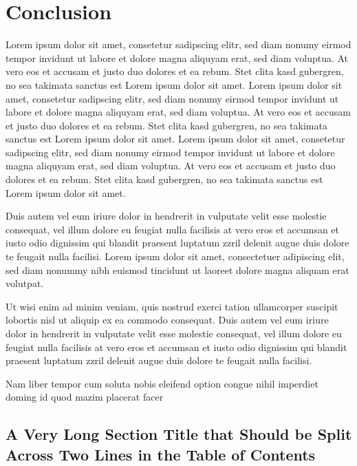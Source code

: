 
\chapter{Conclusion}

Lorem ipsum dolor sit amet, consetetur sadipscing elitr, sed diam nonumy eirmod tempor invidunt ut labore et dolore magna aliquyam erat, sed diam voluptua. At vero eos et accusam et justo duo dolores et ea rebum. Stet clita kasd gubergren, no sea takimata sanctus est Lorem ipsum dolor sit amet. Lorem ipsum dolor sit amet, consetetur sadipscing elitr, sed diam nonumy eirmod tempor invidunt ut labore et dolore magna aliquyam erat, sed diam voluptua. At vero eos et accusam et justo duo dolores et ea rebum. Stet clita kasd gubergren, no sea takimata sanctus est Lorem ipsum dolor sit amet. Lorem ipsum dolor sit amet, consetetur sadipscing elitr, sed diam nonumy eirmod tempor invidunt ut labore et dolore magna aliquyam erat, sed diam voluptua. At vero eos et accusam et justo duo dolores et ea rebum. Stet clita kasd gubergren, no sea takimata sanctus est Lorem ipsum dolor sit amet.   

Duis autem vel eum iriure dolor in hendrerit in vulputate velit esse molestie consequat, vel illum dolore eu feugiat nulla facilisis at vero eros et accumsan et iusto odio dignissim qui blandit praesent luptatum zzril delenit augue duis dolore te feugait nulla facilisi. Lorem ipsum dolor sit amet, consectetuer adipiscing elit, sed diam nonummy nibh euismod tincidunt ut laoreet dolore magna aliquam erat volutpat.   

Ut wisi enim ad minim veniam, quis nostrud exerci tation ullamcorper suscipit lobortis nisl ut aliquip ex ea commodo consequat. Duis autem vel eum iriure dolor in hendrerit in vulputate velit esse molestie consequat, vel illum dolore eu feugiat nulla facilisis at vero eros et accumsan et iusto odio dignissim qui blandit praesent luptatum zzril delenit augue duis dolore te feugait nulla facilisi.   

Nam liber tempor cum soluta nobis eleifend option congue nihil imperdiet doming id quod mazim placerat facer



\section{A Very Long Section Title that Should be Split Across Two Lines in the Table of Contents}


